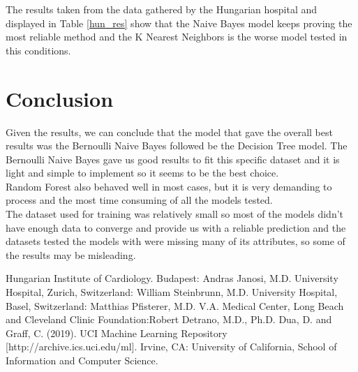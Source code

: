 \documentclass[conference]{IEEEtran}
\begin{document}
The results taken from the data gathered by the Hungarian hospital\cite{hun} and displayed in Table \ref{hun_res} show that the Naive Bayes model keeps proving the most reliable method and the K Nearest Neighbors is the worse model tested in this conditions.

\section{Conclusion}

Given the results, we can conclude that the model that gave the overall best results was the Bernoulli Naive Bayes followed be the Decision Tree model. The Bernoulli Naive Bayes gave us good results to fit this specific dataset and it is light and simple to implement so it seems to be the best choice.
\\Random Forest also behaved well in most cases, but it is very demanding to process and the most time consuming of all the models tested.
\\The dataset used for training was relatively small so most of the models didn't have enough data to converge and provide us with a reliable prediction and the datasets tested the models with were missing many of its attributes, so some of the results may be misleading.

\begin{thebibliography}{00}
     Hungarian Institute of Cardiology. Budapest: Andras Janosi, M.D.
     University Hospital, Zurich, Switzerland: William Steinbrunn, M.D.
     University Hospital, Basel, Switzerland: Matthias Pfisterer, M.D.
     V.A. Medical Center, Long Beach and Cleveland Clinic Foundation:Robert Detrano, M.D., Ph.D.
     Dua, D. and Graff, C. (2019). UCI Machine Learning Repository [http://archive.ics.uci.edu/ml]. Irvine, CA: University of California, School of Information and Computer Science.
\end{thebibliography}
\end{document}
